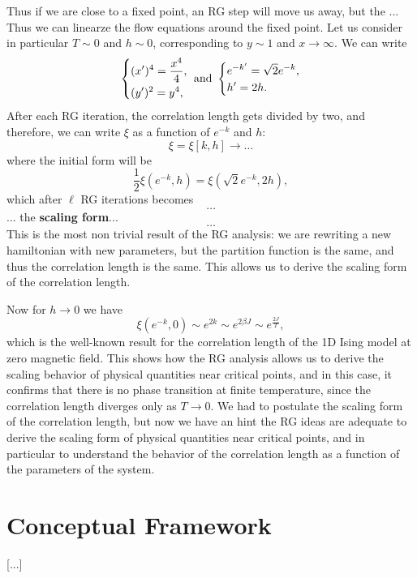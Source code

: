 Thus if we are close to a fixed point, an RG step will move us away, but the ... Thus we can linearze the flow equations around the fixed point. Let us consider in particular \(T \sim 0\) and \(h \sim 0\), corresponding to \(y \sim 1\) and \(x \to \infty\). We can write
\[
    \begin{dcases}
        (x^{\prime})^4 = \frac{x^4}{4}, \\
        (y^{\prime})^2 = y^4,
    \end{dcases} \text{ and } \begin{dcases}
        e^{-k^{\prime}} = \sqrt{2} e^{-k}, \\
        h' = 2 h.
    \end{dcases}
\]
After each RG iteration, the correlation length gets divided by two, and therefore, we can write \(\xi\) as a function of \(e^{-k}\) and \(h\):
\[
    \xi = \xi[k,h] \to \dots
\]
where the initial form will be
\[
    \frac{1}{2} \xi(e^{-k}, h) = \xi(\sqrt{2} e^{-k}, 2h),
\]
which after \(\ell\) RG iterations becomes
\[
    \dots
\]
... the \textbf{scaling form}...
\[
    \dots
\]
This is the most non trivial result of the RG analysis: we are rewriting a new hamiltonian with new parameters, but the partition function is the same, and thus the correlation length is the same. This allows us to derive the scaling form of the correlation length.

Now for \(h \to 0\) we have
\[
    \xi(e^{-k}, 0) \sim e^{2k} \sim e^{2\beta J} \sim e^{\frac{2J}{T}},
\]
which is the well-known result for the correlation length of the 1D Ising model at zero magnetic field. This shows how the RG analysis allows us to derive the scaling behavior of physical quantities near critical points, and in this case, it confirms that there is no phase transition at finite temperature, since the correlation length diverges only as \(T \to 0\). We had to postulate the scaling form of the correlation length, but now we have an hint the RG ideas are adequate to derive the scaling form of physical quantities near critical points, and in particular to understand the behavior of the correlation length as a function of the parameters of the system.

\section{Conceptual Framework}

 [...]

